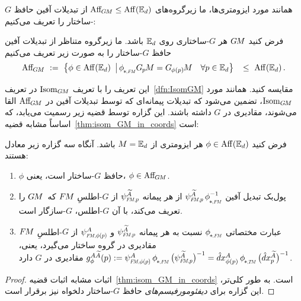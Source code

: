 همانند مورد ایزومتری‌ها، ما زیرگروه‌های $\operatorname{Aff}_{\mkern-2muG\mkern-1.4muM} \leq \operatorname{Aff}(\mathbb{E}_d)$ از تبدیلات آفین حافظ $G$-ساختار را تعریف می‌کنیم:
\begin{dfn}
	\label{dfn:AffGM}
	فرض کنید $G\mkern-1.4muM$ هر $G$-ساختاری روی $\mathbb{E}_d$ باشد.
	ما زیرگروه متناظر از تبدیلات آفین حافظ $G$-ساختار را به صورت زیر تعریف می‌کنیم
	\begin{align}
		\AffGM\ :=\ \big\{ \phi \in \AffE 
		\,\big|\, \dphiFM \GpM = \GphipM\ \ \ \forall p \in \Euc_d \big\} 
		\,\ \leq\ \AffE \,.
	\end{align}
\end{dfn}
این تعریف را با تعریف $\operatorname{Isom}_{G\mkern-1.4muM}$ در تعریف~\ref{dfn:IsomGM} مقایسه کنید.
همانند مورد $\operatorname{Isom}_{G\mkern-1.4muM}$، تضمین می‌شود که تبدیلات پیمانه‌ای که توسط تبدیلات آفین در $\operatorname{Aff}_{\mkern-2muG\mkern-1.4muM}$ القا می‌شوند، مقادیری در $G$ داشته باشند.
این گزاره توسط قضیه زیر رسمیت می‌یابد، که اساساً مشابه قضیه~\ref{thm:isom_GM_in_coords} است:
\begin{thm}
	\label{thm:Aff_GM_in_gauges}
	فرض کنید $\phi \in \operatorname{Aff}(\mathbb{E}_d)$ هر ایزومتری از $M=\mathbb{E}_d$ باشد.
	آنگاه سه گزاره زیر معادل هستند:
	\begin{enumerate}
		\item $\phi$ حافظ $G$-ساختار است، یعنی، $\phi \in \operatorname{Aff}_{\mkern-2muG\mkern-1.4muM}$.
		\item پول‌بک تبدیل آفین $\psiFMp^{\widetilde{A}}\, \dphiFM^{-1}$ از هر پیمانه $\psiFMp^{\widetilde{A}}$ از $G$-اطلسِ $F\mkern-1.5muM$ که~$G\mkern-1.4muM$ را تعریف می‌کند، با آن $G$-اطلس، $G$-سازگار است.
		\item
		عبارت مختصاتی $\dphiFM$ نسبت به هر پیمانه $\psiFMp^{\widetilde{A}}$ و $\psiFMphip^A$ از $G$-اطلسِ $F\mkern-1.5muM$ مقادیری در گروه ساختار می‌گیرد، یعنی،
		${g_\phi^{A\widetilde{A}}(p)
			:= \psiFMphip^A \,\dphiFM\, \big(\psiFMp^{\widetilde{A}} \big)^{-1}}
		= \hat{d}x^A_{\phi(p)} \,\dphiTM\, \big(\hat{d}x^{\widetilde{A}}_p \big)^{-1}$
		مقادیری در $G$ دارد.
	\end{enumerate}
\end{thm}
\begin{proof}
	اثبات مشابه اثبات قضیه~\ref{thm:isom_GM_in_coords} است.
	به طور کلی‌تر، این گزاره برای \emph{دیفئومورفیسم‌های} حافظ $G$-ساختار دلخواه نیز برقرار است.
\end{proof}



